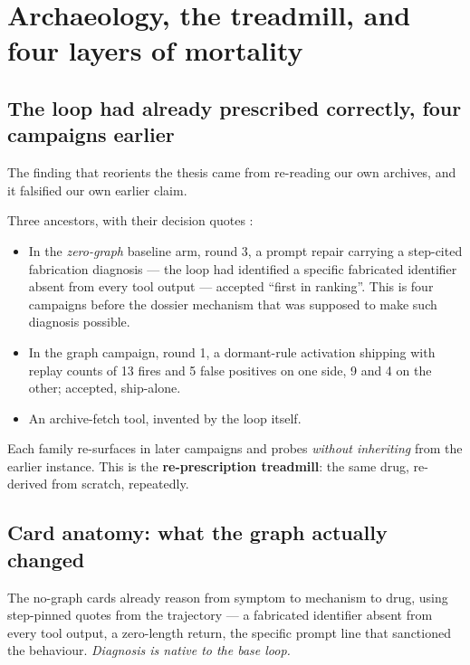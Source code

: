 \section{Archaeology, the treadmill, and four layers of mortality}
\label{sec:archaeology}

\subsection*{The loop had already prescribed correctly, four campaigns
earlier}

The finding that reorients the thesis came from re-reading our own
archives, and it falsified our own earlier claim.

Three ancestors, with their decision quotes :

\begin{itemize}
  \item In the \emph{zero-graph} baseline arm, round 3, a prompt repair
        carrying a step-cited fabrication diagnosis --- the loop had
        identified a specific fabricated identifier absent from every tool
        output --- accepted ``first in ranking''. This is four campaigns
        before the dossier mechanism that was supposed to make such
        diagnosis possible.
  \item In the graph campaign, round 1, a dormant-rule activation shipping
        with replay counts of 13 fires and 5 false positives on one side,
        9 and 4 on the other; accepted, ship-alone.
  \item An archive-fetch tool, invented by the loop itself.
\end{itemize}

Each family re-surfaces in later campaigns and probes \emph{without
inheriting} from the earlier instance. This is the \textbf{re-prescription
treadmill}: the same drug, re-derived from scratch, repeatedly.

\subsection*{Card anatomy: what the graph actually changed}

The no-graph cards already reason from symptom to mechanism to drug, using
step-pinned quotes from the trajectory --- a fabricated identifier absent
from every tool output, a zero-length return, the specific prompt line that
sanctioned the behaviour. \emph{Diagnosis is native to the base loop.}

